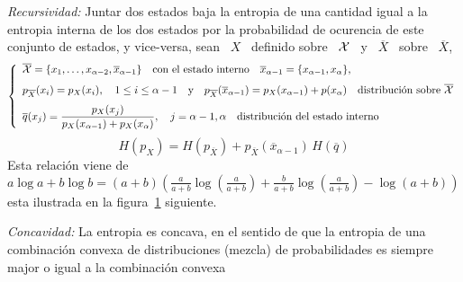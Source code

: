 \begin{propiedades}
%
\setcounter{PropRecursividad}{\value{enumi}}
\item\label{prop:SZ:recursividad} {\it Recursividad:} Juntar dos estados baja la
  entropia de una cantidad igual a la entropia interna de los dos estados por la
  probabilidad de ocurencia de este  conjunto de estados, y vice-versa, \ie sean
  \ $X$ \ definido sobre \ $\mathcal{X}$ \ y \ $\overline{X}$ \ sobre \ $\overline{X}$,
  \[
  \left\{  \begin{array}{l}\overline{\mathcal{X}} =  \{  x_1 ,  \ldots  , x_{\alpha-2}  ,
      \overline{x}_{\alpha-1}\}  \quad   \mbox{con  el  estado   interno}  \quad
      \overline{x}_{\alpha-1}   =  \{   x_{\alpha-1}  ,   x_\alpha  \},\\[2.5mm]
      p_{\overline{X}}(x_i)  = p_X(x_i),  \quad 1  \le i  \le \alpha-1  \quad \mbox{y}
      \quad p_{\overline{X}}(\overline{x}_{\alpha-1}) = p_X(x_{\alpha-1}) +
      p(x_\alpha)  \quad  \mbox{distribuci\'on  sobre  }  \overline{\mathcal{X}}\\[2.5mm]
      \displaystyle   \overline{q}(x_j)    =   \frac{p_X(x_j)}{p_X(x_{\alpha-1})   +
        p_X(x_\alpha)}, \quad j =  \alpha-1, \alpha \quad \mbox{distribuci\'on del
        estado   interno}\end{array}\right.
  \]
  \[
  H(p_X)  = H(p_{\overline{X}})  +  p_{\overline{X}}(\overline{x}_{\alpha-1}) \,
  H(\overline{q})
  \]
  Esta relaci\'on  viene de $a \log  a + b  \log b = (a+b)  \left( \frac{a}{a+b}
    \log\left(  \frac{a}{a+b} \right)  + \frac{b}{a+b}  \log\left( \frac{a}{a+b}
    \right)   -    \log(   a    +   b   )\right)$    esta   ilustrada    en   la
  figura~\ref{fig:SZ:Recursividad} siguiente.\newline
  \begin{figure}[h!]
  \begin{center}  \end{center}
  \label{fig:SZ:Recursividad}
  \end{figure}
%
\setcounter{PropConcavidad}{\value{enumi}}
\item\label{prop:SZ:concavidad} {\it Concavidad:} La  entropia es concava, en el
  sentido  de que  la entropia  de una  combinaci\'on convexa  de distribuciones
  (mezcla) de probabilidades es siempre major o igual a la combinaci\'on convexa

\end{propiedades}
